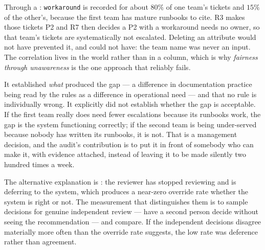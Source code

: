 \begin{ans}
  \item Through a : \texttt{workaround} is recorded for about $80\%$ of
        one team's tickets and $15\%$ of the other's, because the first team has
        mature runbooks to cite. R3 makes those tickets P2 and R7 then decides a P2
        with a workaround needs no owner, so that team's tickets are systematically
        not escalated. Deleting an attribute would not have prevented it, and could
        not have: the team name was never an input. The correlation lives in the
        world rather than in a column, which is why \emph{fairness through
        unawareness} is the one approach that reliably fails.
  \item It established \emph{what} produced the gap --- a difference in
        documentation practice being read by the rules as a difference in
        operational need --- and that no rule is individually wrong. It explicitly
        did not establish whether the gap is acceptable. If the first team really
        does need fewer escalations because its runbooks work, the gap is the system
        functioning correctly; if the second team is being under-served because
        nobody has written its runbooks, it is not. That is a management decision,
        and the audit's contribution is to put it in front of somebody who can make
        it, with evidence attached, instead of leaving it to be made silently two
        hundred times a week.
  \item The alternative explanation is : the reviewer has
        stopped reviewing and is deferring to the system, which produces a near-zero
        override rate whether the system is right or not. The measurement that
        distinguishes them is to sample decisions for genuine independent review ---
        have a second person decide without seeing the recommendation --- and
        compare. If the independent decisions disagree materially more often than
        the override rate suggests, the low rate was deference rather than
        agreement.
\end{ans}

